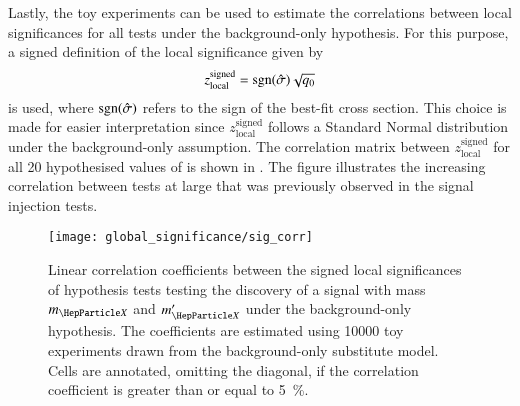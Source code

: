 Lastly, the toy experiments can be used to estimate the correlations between
local significances for all tests under the background-only hypothesis. For this
purpose, a signed definition of the local significance given by
\begin{align*}
  z_{\text{local}}^{\text{signed}} = \operatorname{sgn}(\hat{\sigma}) \sqrt{q_0}
\end{align*}
is used, where $\operatorname{sgn}(\hat{\sigma})$ refers to the sign of the best-fit cross
section. This choice is made for easier interpretation since
$z_{\text{local}}^{\text{signed}}$ follows a Standard Normal distribution under
the background-only assumption. The correlation matrix between
$z_{\text{local}}^{\text{signed}}$ for all 20 hypothesised values of \mX is
shown in . The figure illustrates the increasing correlation
between tests at large \mX that was previously observed in the signal injection
tests.

\begin{figure}[htbp]
  \centering

  \texttt{[image: global\_significance/sig\_corr]}

  \caption[Correlation coefficient between the local significances of discovery
  tests for a signal with mass $\mX$ and $\mX^\prime$ under the background-only
  hypothesis.]{Linear correlation coefficients between the signed local
    significances of hypothesis tests testing the discovery of a signal with
    mass $\mX$ and $\mX^\prime$ under the background-only hypothesis. The
    coefficients are estimated using \num{10000} toy experiments drawn from the
    background-only substitute model. Cells are annotated, omitting the
    diagonal, if the correlation coefficient is greater than or equal to
    \SI{5}{\percent}.}%
  \label{fig:corr_sig}
\end{figure}

